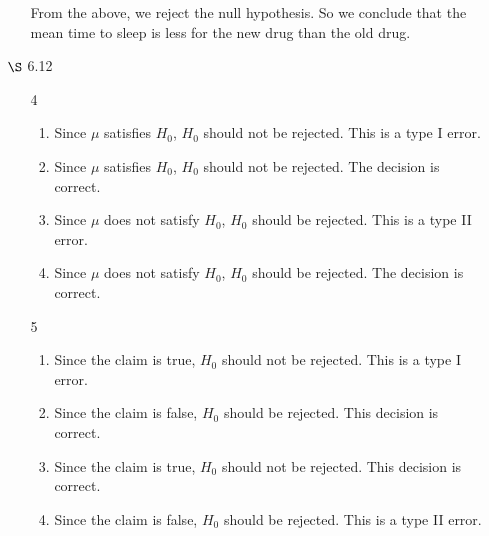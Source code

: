\documentclass[12pt,letterpaper]{article}
\begin{document}
\begin{enumerate}
\begin{enumerate}
          From the above, we reject the null hypothesis.
          So we conclude that the mean time to sleep is less for the new drug than the old drug.
      \end{enumerate}
    \item [$\S$ 6.12]
      \begin{enumerate}
        \item [4]
          \begin{enumerate}[label=(\arabic*)]
            \item
              Since $\mu$ satisfies $H_0$, $H_0$ should not be rejected.
              This is a type I error.
            \item
              Since $\mu$ satisfies $H_0$, $H_0$ should not be rejected.
              The decision is correct.
            \item
              Since $\mu$ does not satisfy $H_0$, $H_0$ should be rejected.
              This is a type II error.
            \item
              Since $\mu$ does not satisfy $H_0$, $H_0$ should be rejected.
              The decision is correct.
          \end{enumerate}
        \item [5]
          \begin{enumerate}[label=(\arabic*)]
            \item
              Since the claim is true, $H_0$ should not be rejected.
              This is a type I error.
            \item
              Since the claim is false, $H_0$ should be rejected.
              This decision is correct.
            \item
              Since the claim is true, $H_0$ should not be rejected.
              This decision is correct.
            \item
              Since the claim is false, $H_0$ should be rejected.
              This is a type II error.
          \end{enumerate}
      \end{enumerate}
  \end{enumerate}
\end{document}

